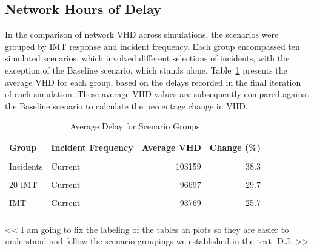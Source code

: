 \documentclass[fancy, oneside, mastersfancy, ms]{byuthesis}
\begin{document}
\hypertarget{network-hours-of-delay}{%
\subsection{Network Hours of Delay}\label{network-hours-of-delay}}

In the comparison of network VHD across simulations, the scenarios were
grouped by IMT response and incident frequency. Each group encompassed
ten simulated scenarios, which involved different selections of
incidents, with the exception of the Baseline scenario, which stands
alone. Table~\ref{tbl-network_delays_table} presents the average VHD for
each group, based on the delays recorded in the final iteration of each
simulation. These average VHD values are subsequently compared against
the Baseline scenario to calculate the percentage change in VHD.

\hypertarget{tbl-network_delays_table}{}
\begin{table}
\caption{\label{tbl-network_delays_table}Average Delay for Scenario Groups }\tabularnewline

\centering
\begin{tabular}[t]{llrr}
\toprule
\textbf{Group} & \textbf{Incident Frequency} & \textbf{Average VHD} & \textbf{Change (\%)}\\
\midrule
\cellcolor{gray!6}{Baseline} & \cellcolor{gray!6}{-} & \cellcolor{gray!6}{74568} & \cellcolor{gray!6}{0.0}\\
Incidents & Current & 103159 & 38.3\\
\cellcolor{gray!6}{Incidents} & \cellcolor{gray!6}{Increased} & \cellcolor{gray!6}{104178} & \cellcolor{gray!6}{39.7}\\
20 IMT & Current & 96697 & 29.7\\
\cellcolor{gray!6}{20 IMT} & \cellcolor{gray!6}{Increased} & \cellcolor{gray!6}{95678} & \cellcolor{gray!6}{28.3}\\
\addlinespace
30 IMT & Current & 93769 & 25.7\\
\cellcolor{gray!6}{30 IMT} & \cellcolor{gray!6}{Increased} & \cellcolor{gray!6}{93560} & \cellcolor{gray!6}{25.5}\\
\bottomrule
\end{tabular}
\end{table}

\textless\textless{} I am going to fix the labeling of the tables an
plots so they are easier to understand and follow the scenario groupings
we established in the text -D.J. \textgreater\textgreater{}
\end{document}

